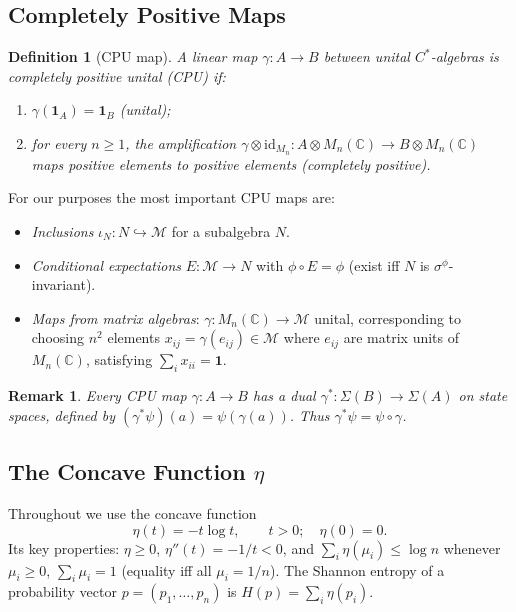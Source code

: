 \documentclass[12pt,a4paper]{article}
\newtheorem{definition}[theorem]{Definition}
\newtheorem{remark}[theorem]{Remark}
\newcommand{\CC}{\mathbb{C}}
\newcommand{\id}{\mathbf{1}}  %
\newcommand{\Mn}{M_n(\CC)}
\newcommand{\vN}{\mathcal{M}}      %
\begin{document}
\subsection{Completely Positive Maps}

\begin{definition}[CPU map]\label{def:cpu}
A linear map $\gamma: A\to B$ between unital $C^*$-algebras is
\emph{completely positive unital} (CPU) if:
\begin{enumerate}
\item[(a)] $\gamma(\id_A)=\id_B$ (unital);
\item[(b)] for every $n\ge 1$, the amplification
  $\gamma\otimes\mathrm{id}_{M_n}: A\otimes\Mn\to B\otimes\Mn$
  maps positive elements to positive elements (completely positive).
\end{enumerate}
\end{definition}

For our purposes the most important CPU maps are:
\begin{itemize}
\item \emph{Inclusions} $\iota_N: N\hookrightarrow\vN$ for a subalgebra $N$.
\item \emph{Conditional expectations} $E:\vN\to N$ with $\phi\circ E=\phi$
  (exist iff $N$ is $\sigma^\phi$-invariant).
\item \emph{Maps from matrix algebras}: $\gamma:\Mn\to\vN$ unital, corresponding
  to choosing $n^2$ elements $x_{ij}=\gamma(e_{ij})\in\vN$ where $e_{ij}$ are
  matrix units of $\Mn$, satisfying $\sum_{i}x_{ii}=\id$.
\end{itemize}

\begin{remark}\label{rmk:cpu_dual}
Every CPU map $\gamma:A\to B$ has a dual $\gamma^*:\Sigma(B)\to\Sigma(A)$ on state
spaces, defined by $(\gamma^*\psi)(a)=\psi(\gamma(a))$.  Thus $\gamma^*\psi=\psi\circ\gamma$.
\end{remark}

\subsection{The Concave Function $\eta$}

Throughout we use the concave function
\begin{equation}\label{eq:eta}
  \eta(t) = -t\log t, \qquad t>0; \quad \eta(0)=0.
\end{equation}
Its key properties: $\eta\ge 0$, $\eta''(t)=-1/t<0$, and $\sum_i \eta(\mu_i)\le\log n$
whenever $\mu_i\ge 0$, $\sum_i\mu_i=1$ (equality iff all $\mu_i=1/n$).
The Shannon entropy of a probability vector $p=(p_1,\ldots,p_n)$ is
$H(p)=\sum_i\eta(p_i)$.
\end{document}
